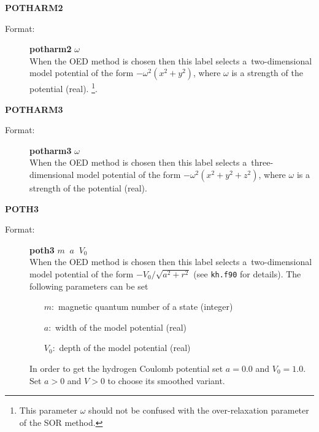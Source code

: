 \documentclass[12pt,a4paper]{article}
\newcommand{\ft}[1]{\texttt{#1}}
\begin{document}
\begin{description}
\item \textbf{POTHARM2}
\begin{description}
\item[Format:] \textbf{potharm2} $\omega$ \\ When the OED method is chosen then this
  label selects a~two-dimensional model potential of the form $-\omega^2(x^2+y^2)$, where
  $\omega$ is a strength of the potential (real).%
  \footnote{This parameter $\omega$ should not be confused with the
    over-relaxation parameter of the SOR method.}.
\end{description}


\item \textbf{POTHARM3}
\begin{description}
\item[Format:] \textbf{potharm3} $\omega$ \\ When the OED method is chosen then this label
  selects a~three-dimensional model potential of the form $-\omega^2(x^2+y^2+z^2)$, where
  $\omega$ is a strength of the potential (real).
\end{description}



\item \textbf{POTH3}
\begin{description}
\item[Format:] \textbf{poth3} $m\;\;a\;\;V_0$ \\ When the OED method
  is chosen then this label selects a~two-dimensional model potential
  of the form $ -V_0/\sqrt{a^2+r^2}$ (see \ft{kh.f90} for
  details). The following parameters can be set

\begin{itemize}
\item [$m:$] magnetic quantum number of a state (integer)
\item [$a:$] width of the model potential (real)
\item [$V_0:$] depth of the model potential (real)
\end{itemize}
In order to get the hydrogen Coulomb potential set $a=0.0$ and
$V_0=1.0$. Set $a>0$ and $V>0$ to choose its smoothed variant.

\end{description}



\end{description}
\end{document}
